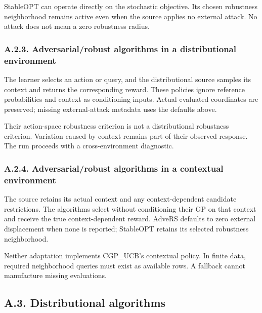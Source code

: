 \documentclass[10pt,a4paper]{article}
\begin{document}
StableOPT can operate directly on the stochastic objective. Its chosen robustness neighborhood remains active even when the source applies no external attack. No attack does not mean a zero robustness radius.


\subsubsection*{A.2.3. Adversarial/robust algorithms in a distributional environment}

The learner selects an action or query,\allowbreak{} and the distributional source samples its context and returns the corresponding reward. These policies ignore reference probabilities and context as conditioning inputs. Actual evaluated coordinates are preserved; missing external-attack metadata uses the defaults above.


Their action-space robustness criterion is not a distributional robustness criterion. Variation caused by context remains part of their observed response. The run proceeds with a cross-environment diagnostic.


\subsubsection*{A.2.4. Adversarial/robust algorithms in a contextual environment}

The source retains its actual context and any context-dependent candidate restrictions. The algorithms select without conditioning their GP on that context and receive the true context-dependent reward. AdveRS defaults to zero external displacement when none is reported; StableOPT retains its selected robustness neighborhood.


Neither adaptation implements CGP\_\allowbreak{}UCB's contextual policy. In finite data,\allowbreak{} required neighborhood queries must exist as available rows. A fallback cannot manufacture missing evaluations.


\subsection*{A.3. Distributional algorithms}
\end{document}
